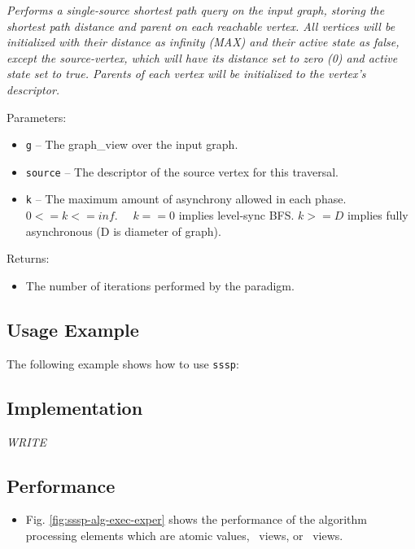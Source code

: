 \textit{
Performs a single-source shortest path query on the input graph, storing the shortest path distance and parent on each reachable vertex. All vertices will be initialized with their distance as infinity (MAX) and their active state as false, except the source-vertex, which will have its distance set to zero (0) and active state set to true. Parents of each vertex will be initialized to the vertex's descriptor.
}
\vspace{0.4cm}

Parameters:
\begin{itemize}
\item
\texttt{g} --
The graph\_view over the input graph.
\item
\texttt{source} --
The descriptor of the source vertex for this traversal.
\item
\texttt{k} --
The maximum amount of asynchrony allowed in each phase. $0 <= k <= inf.$ \ \ $k == 0$ implies level-sync BFS. $k >= D$ implies fully asynchronous (D is diameter of graph).
\end{itemize}

Returns:
\begin{itemize}
\item
The number of iterations performed by the paradigm. 
\end{itemize}

\subsection{Usage Example} \label{sec-sssp-alg-use}

The following example shows how to use
\texttt{sssp}:


\subsection{Implementation} \label{sec-sssp-alg-impl}

\textit{WRITE}

\subsection{Performance} \label{sec-sssp-alg-perf}

\begin{itemize}
\item
Fig. \ref{fig:sssp-alg-exec-exper}
shows the performance of the algorithm processing
elements which are atomic values, \stl\ views, or \stapl\ views.
\end{itemize}

